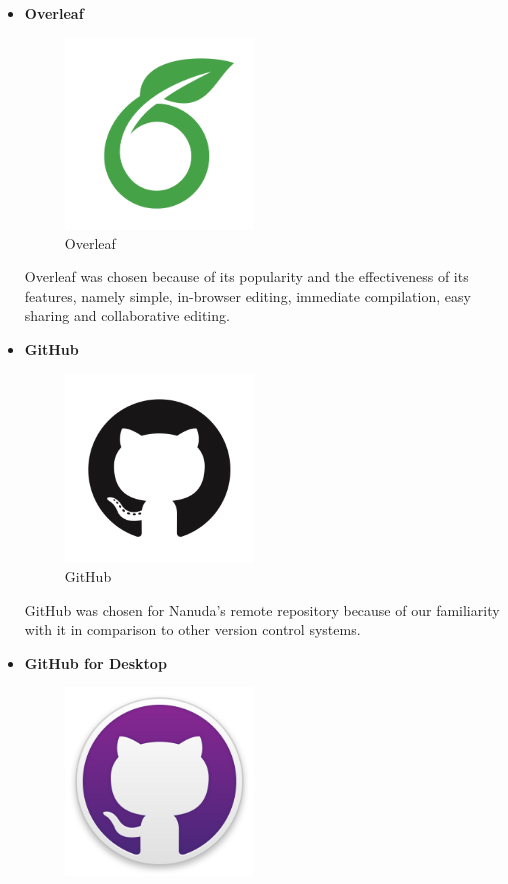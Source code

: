 \documentclass[conference]{IEEEtran}
\begin{document}
\begin{enumerate}
\begin{itemize}
        \item \textbf{Overleaf} 
        \begin{figure}[H]
            \centerline{\includegraphics[width=50mm,scale=0.5]{img/logo/logo-overleaf.png}}
            \caption{Overleaf}
            \label{overleaf-logo}
        \end{figure}
        Overleaf was chosen because of its popularity and the effectiveness of its features, namely simple, in-browser editing, immediate compilation, easy sharing and collaborative editing.
        \newline
        \item \textbf{GitHub} 
        \begin{figure}[H]
            \centerline{\includegraphics[width=50mm,scale=0.5]{img/logo/logo-github.png}}
            \caption{GitHub}
            \label{github-logo}
        \end{figure}
        GitHub was chosen for Nanuda's remote repository because of our familiarity with it in comparison to other version control systems.
        \newline
        \item \textbf{GitHub for Desktop}
        \begin{figure}[H]
            \centerline{\includegraphics[width=50mm,scale=0.5]{img/logo/logo-githubdesktop.png}}

\end{figure}
\end{itemize}
\end{enumerate}
\end{document}

